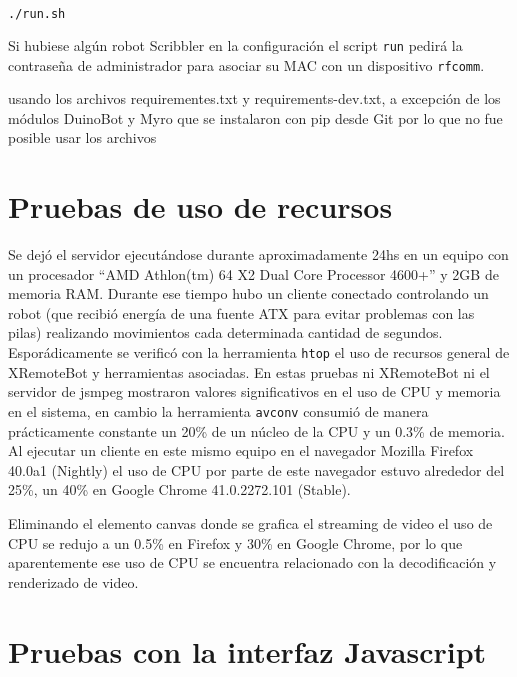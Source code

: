 \begin{lstlisting}[language=bash,
caption={Ejecutar el servidor y procesos asociados},
label=lst:ejecutar_xremotebot]
./run.sh
\end{lstlisting}

Si hubiese algún robot Scribbler en la configuración el script
\texttt{run} pedirá la contraseña de administrador para asociar
su MAC con un dispositivo \texttt{rfcomm}.


usando los archivos requirementes.txt
y requirements-dev.txt, a excepción de los módulos DuinoBot y Myro que se
instalaron con pip desde Git por lo que no fue posible usar los archivos

\section{Pruebas de uso de recursos}
Se dejó el servidor ejecutándose durante aproximadamente 24hs en
un equipo con un procesador
``AMD Athlon(tm) 64 X2 Dual Core Processor 4600+'' y 2GB de memoria
RAM. Durante ese tiempo hubo un cliente conectado controlando
un robot (que recibió energía de una fuente ATX para evitar problemas
con las pilas) realizando movimientos cada determinada cantidad de
segundos. Esporádicamente se verificó con la herramienta
\texttt{htop} el uso de recursos general de XRemoteBot y herramientas
asociadas. En estas pruebas ni XRemoteBot ni el servidor de jsmpeg
mostraron valores significativos en el uso de CPU y memoria en
el sistema, en cambio la herramienta \texttt{avconv} consumió
de manera prácticamente constante un 20\% de un núcleo de la CPU
y un 0.3\% de memoria. Al ejecutar un cliente en este mismo
equipo en el navegador Mozilla Firefox 40.0a1 (Nightly)
el uso de CPU por parte de este navegador estuvo alrededor
del 25\%, un 40\% en Google Chrome 41.0.2272.101 (Stable).

Eliminando el elemento canvas donde se grafica el streaming de video
el uso de CPU se redujo a un 0.5\% en Firefox y 30\% en Google Chrome,
por lo que aparentemente ese uso de CPU se encuentra relacionado
con la decodificación y renderizado de video.

\section{Pruebas con la interfaz Javascript}

